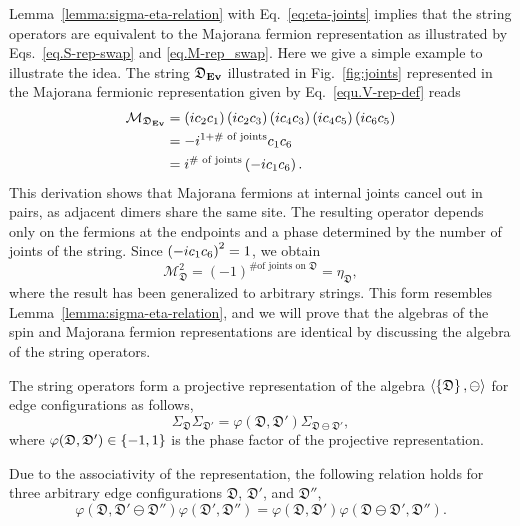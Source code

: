 Lemma~\ref{lemma:sigma-eta-relation} with Eq.~\eqref{eq:eta-joints} implies that the string operators are equivalent to the Majorana fermion representation as illustrated by Eqs.~\eqref{eq.S-rep-swap} and \eqref{eq.M-rep_swap}. Here we give a simple example to illustrate the idea. The string $\mathfrak{D}_{\mathbf{Ev}}$ illustrated in Fig.~\ref{fig:joints} represented in the Majorana fermionic representation given by Eq.~\eqref{equ.V-rep-def} reads
\begin{align*}
\mathcal{M}_{\mathfrak{D}_{\mathbf{Ev}}}
&=
\left( ic_2c_1 \right)\left( ic_2c_3 \right)\left( ic_4c_3 \right)\left( ic_4c_5 \right)\left( ic_6c_5 \right) \\
&= -i^{1 + \text{\# of joints}}c_1c_6 \\
&= i^{\text{\# of joints}} \left( -ic_1c_6 \right).
\end{align*}
This derivation shows that Majorana fermions at internal joints cancel out in pairs, as adjacent dimers share the same site. The resulting operator depends only on the fermions at the endpoints and a phase determined by the number of joints of the string. Since $\left( -ic_1c_6 \right)^2 = 1$, we obtain
\[
\mathcal{M}_{\mathfrak{D}}^2 = (-1)^{\text{\# of joints on $\mathfrak{D}$}} = \eta_{\mathfrak{D}},
\]
where the result has been generalized to arbitrary strings. This form resembles Lemma~\ref{lemma:sigma-eta-relation}, and we will prove that the algebras of the spin and Majorana fermion representations are identical by discussing the algebra of the string operators. 

The string operators form a projective representation of the algebra $\left\langle \left\{ \mathfrak{D} \right\}, \ominus \right\rangle$ for edge configurations as follows,
\begin{equation}\label{eq:phi-phase-factor-def}
  \Sigma_{\mathfrak{D}}\Sigma_{\mathfrak{D}'} = \varphi(\mathfrak{D},\mathfrak{D}') \Sigma_{\mathfrak{D}\ominus\mathfrak{D}'},
\end{equation}
where $\varphi(\mathfrak{D},\mathfrak{D}')\in\left\{ -1,1 \right\}$ is the phase factor of the projective representation. 
\begin{theorem}\label{cor:phase-associativity}
  Due to the associativity of the representation, the following relation holds for three arbitrary edge configurations $\mathfrak{D}$, $\mathfrak{D}'$, and $\mathfrak{D}''$,
\[
\varphi(\mathfrak{D},\mathfrak{D}'\ominus\mathfrak{D}'')\varphi(\mathfrak{D}',\mathfrak{D}'') = 
\varphi(\mathfrak{D},\mathfrak{D}')\varphi(\mathfrak{D}\ominus\mathfrak{D}',\mathfrak{D}'').
\]
\end{theorem}


